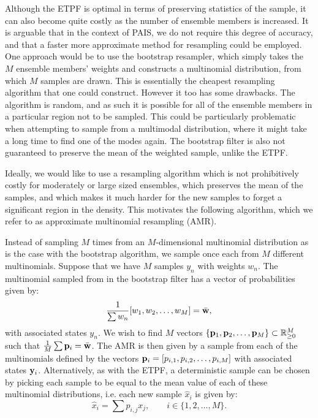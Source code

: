 \documentclass[final]{siamltex}
\begin{document}
Although the ETPF is optimal in terms of preserving statistics of the
sample, it can also become quite costly as the number of ensemble members
is increased. It is arguable that in the context of PAIS, we do not
require this degree of accuracy, and that a faster more approximate
method for resampling could be employed. One approach would be to use
the bootstrap resampler, which simply takes the $M$ ensemble members'
weights and constructs a multinomial distribution, from which $M$
samples are drawn. This is essentially the cheapest resampling
algorithm that one could construct. However it too has some
drawbacks. The algorithm is random, and as such it is possible for all
of the ensemble members in a particular region not to be sampled. This
could be particularly problematic when attempting to sample from a
multimodal distribution, where it might take a long time to find one
of the modes again. The bootstrap filter is also not guaranteed to
preserve the mean of the weighted sample, unlike the ETPF.

Ideally, we would like to use a resampling algorithm which is not
prohibitively costly for moderately or large sized ensembles,
which preserves the mean of the samples, and which makes it much
harder for the new samples to forget a significant region in the
density. This motivates the following algorithm, which we refer to as
approximate multinomial resampling (AMR).

Instead of sampling $M$ times from an $M$-dimensional multinomial
distribution as is the case with the bootstrap algorithm, we sample
once each from $M$ different multinomials. Suppose that we have $M$
samples $y_n$ with weights $w_n$. The multinomial sampled from in the
bootstrap filter has a vector of probabilities given by:
\begin{equation*}
\frac{1}{\sum w_n} [w_1,w_2,\ldots,w_M] = \bar{\bf w},
\end{equation*}
with associated states $y_n$.
We wish to find $M$ vectors $\{{\bf p}_1,{\bf p}_2,\ldots,{\bf p}_M\}
\subset \mathbb{R}^M_{\ge 0}$
such that  $\frac{1}{M} \sum {\bf p}_i = \bar{\bf w}$. The AMR is then
given by a sample from each of the multinomials defined by the vectors
${\bf p}_i = [p_{i,1},p_{i,2},\ldots,p_{i,M}]$ with associated states ${\bf y}_i$. Alternatively, as with the ETPF, a deterministic sample
can be chosen by picking each sample to be equal to the mean value of
each of these multinomial distributions, i.e. each new sample
$\hat{x}_i$ is given by:
\begin{equation}
\hat{x}_i = \sum p_{i,j} x_j, \qquad i \in \{1,2,\ldots,M\}.
\end{equation}
\end{document}
